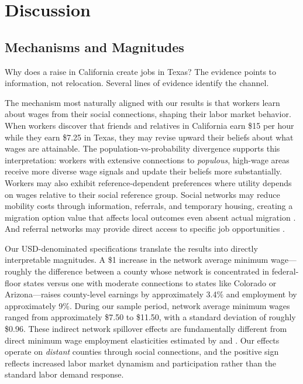 \documentclass[12pt]{article}
\begin{document}
\section{Discussion}
\label{sec:discussion}

\subsection{Mechanisms and Magnitudes}

Why does a raise in California create jobs in Texas? The evidence points to information, not relocation. Several lines of evidence identify the channel.

The mechanism most naturally aligned with our results is that workers learn about wages from their social connections, shaping their labor market behavior. When workers discover that friends and relatives in California earn \$15 per hour while they earn \$7.25 in Texas, they may revise upward their beliefs about what wages are attainable. The population-vs-probability divergence supports this interpretation: workers with extensive connections to \textit{populous}, high-wage areas receive more diverse wage signals and update their beliefs more substantially. Workers may also exhibit reference-dependent preferences where utility depends on wages relative to their social reference group. Social networks may reduce mobility costs through information, referrals, and temporary housing, creating a migration option value that affects local outcomes even absent actual migration \citep{munshi2003networks}. And referral networks may provide direct access to specific job opportunities \citep{kramarz2023}.

Our USD-denominated specifications translate the results into directly interpretable magnitudes. A \$1 increase in the network average minimum wage---roughly the difference between a county whose network is concentrated in federal-floor states versus one with moderate connections to states like Colorado or Arizona---raises county-level earnings by approximately 3.4\% and employment by approximately 9\%. During our sample period, network average minimum wages ranged from approximately \$7.50 to \$11.50, with a standard deviation of roughly \$0.96. These indirect network spillover effects are fundamentally different from direct minimum wage employment elasticities estimated by \citet{cengiz2019effect} and \citet{jardim2024}. Our effects operate on \textit{distant} counties through social connections, and the positive sign reflects increased labor market dynamism and participation rather than the standard labor demand response.
\end{document}
